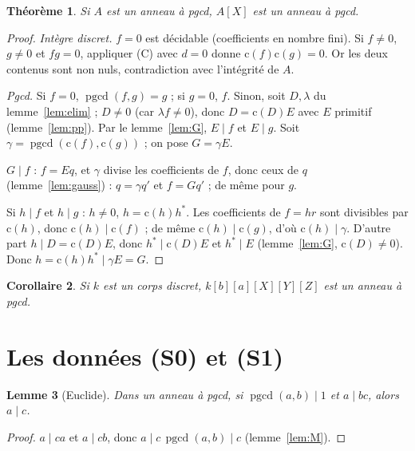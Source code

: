\documentclass[11pt]{amsart}
\newtheorem{theorem}{Théorème}
\newtheorem{lemma}[theorem]{Lemme}
\newtheorem{corollary}[theorem]{Corollaire}
\theoremstyle{definition}
\theoremstyle{remark}
\newcommand{\pgcd}{\operatorname{pgcd}}
\newcommand{\cont}{\mathrm c}
\begin{document}
\begin{theorem}\label{thm:main}
Si $A$ est un anneau à pgcd, $A[X]$ est un anneau à pgcd.
\end{theorem}
\begin{proof}
\emph{Intègre discret.} $f=0$ est décidable (coefficients en nombre fini).
Si $f\ne0$, $g\ne0$ et $fg=0$, appliquer (C) avec $d=0$ donne
$\cont(f)\cont(g)=0$. Or les deux contenus sont non nuls, contradiction
avec l'intégrité de $A$.

\emph{Pgcd.} Si $f=0$, $\pgcd(f,g)=g$ ; si $g=0$, $f$. Sinon, soit
$D,\lambda$ du lemme~\ref{lem:elim} ; $D\ne0$ (car $\lambda f\ne0$), donc
$D=\cont(D)E$ avec $E$ primitif (lemme~\ref{lem:pp}). Par le
lemme~\ref{lem:G}, $E\mid f$ et $E\mid g$. Soit
$\gamma=\pgcd(\cont(f),\cont(g))$ ; on pose $G=\gamma E$.

$G\mid f$ : $f=Eq$, et $\gamma$ divise les coefficients de $f$, donc
ceux de $q$ (lemme~\ref{lem:gauss}) : $q=\gamma q'$ et $f=Gq'$ ; de même
pour $g$.

Si $h\mid f$ et $h\mid g$ : $h\ne0$, $h=\cont(h)h^*$. Les coefficients de
$f=hr$ sont divisibles par $\cont(h)$, donc $\cont(h)\mid\cont(f)$ ; de
même $\cont(h)\mid\cont(g)$, d'où $\cont(h)\mid\gamma$. D'autre part
$h\mid D=\cont(D)E$, donc $h^*\mid\cont(D)E$ et $h^*\mid E$
(lemme~\ref{lem:G}, $\cont(D)\ne0$). Donc $h=\cont(h)h^*\mid\gamma E=G$.
\end{proof}

\begin{corollary}\label{cor:iter}
Si $k$ est un corps discret, $k[b][a][X][Y][Z]$ est un anneau à pgcd.
\end{corollary}

\section{Les données (S0) et (S1)}\label{sec:S}

\begin{lemma}[Euclide]\label{lem:euclide}
Dans un anneau à pgcd, si $\pgcd(a,b)\mid1$ et $a\mid bc$, alors
$a\mid c$.
\end{lemma}
\begin{proof}
$a\mid ca$ et $a\mid cb$, donc $a\mid c\,\pgcd(a,b)\mid c$
(lemme~\ref{lem:M}).
\end{proof}
\end{document}
